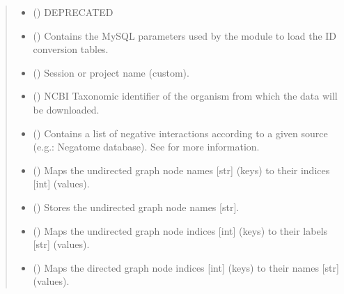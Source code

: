 \documentclass[letterpaper,10pt,english]{sphinxmanual}
\begin{document}
\begin{fulllineitems}
\begin{quote}
\begin{description}
\begin{itemize}
\item {} 
 () \textendash{} DEPRECATED

\item {} 
 () \textendash{} Contains the MySQL parameters used by the
 module to load the ID conversion
tables.

\item {} 
 () \textendash{} Session or project name (custom).

\item {} 
 () \textendash{} NCBI Taxonomic identifier of the organism from which the data
will be downloaded.

\item {} 
 () \textendash{} Contains a list of negative interactions according to a given
source (e.g.: Negatome database). See
{\hyperref[\detokenize{main:pypath.main.PyPath.apply_negative}]{}} for more
information.

\item {} 
 () \textendash{} Maps the undirected graph node names {[}str{]} (keys) to their
indices {[}int{]} (values).

\item {} 
 () \textendash{} Stores the undirected graph node names {[}str{]}.

\item {} 
 () \textendash{} Maps the undirected graph node indices {[}int{]} (keys) to their
labels {[}str{]} (values).

\item {} 
 () \textendash{} Maps the directed graph node indices {[}int{]} (keys) to their names
{[}str{]} (values).


\end{itemize}
\end{description}
\end{quote}
\end{fulllineitems}
\end{document}
